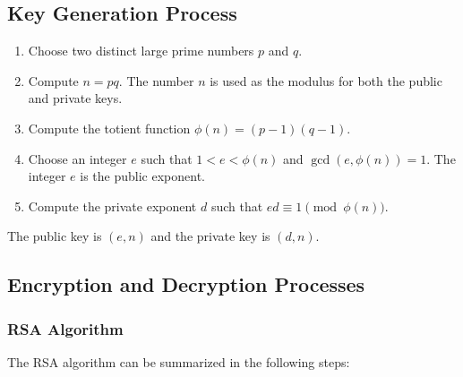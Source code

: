 \documentclass{article}
\begin{document}
\subsection{Key Generation Process}
\begin{enumerate}
    \item Choose two distinct large prime numbers \( p \) and \( q \).
    \item Compute \( n = pq \). The number \( n \) is used as the modulus for both the public and private keys.
    \item Compute the totient function \( \phi(n) = (p-1)(q-1) \).
    \item Choose an integer \( e \) such that \( 1 < e < \phi(n) \) and \( \gcd(e, \phi(n)) = 1 \). The integer \( e \) is the public exponent.
    \item Compute the private exponent \( d \) such that \( ed \equiv 1 \pmod{\phi(n)} \).
\end{enumerate}

The public key is \( (e, n) \) and the private key is \( (d, n) \).

\subsection{Encryption and Decryption Processes}

\subsubsection{RSA Algorithm}
The RSA algorithm can be summarized in the following steps:
\end{document}
